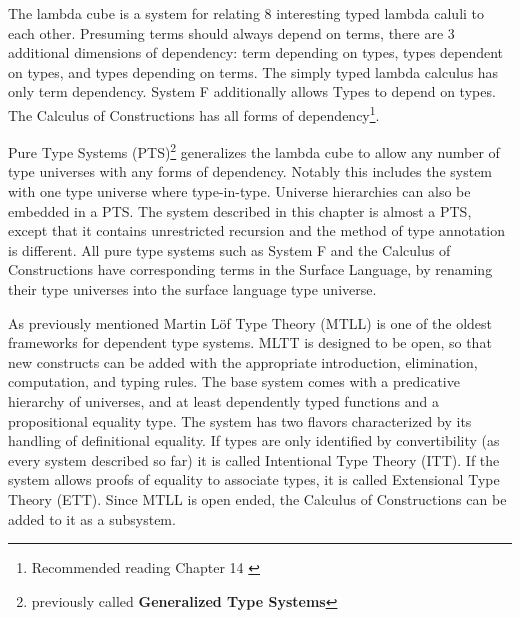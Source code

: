 The lambda cube is a system for relating 8 interesting typed lambda caluli to each other.
Presuming terms should always depend on terms, there are 3 additional dimensions of dependency: term depending on types, types dependent on types, and types depending on terms.
The simply typed lambda calculus has only term dependency.
System F additionally allows Types to depend on types.
The Calculus of Constructions has all forms of dependency\footnote{Recommended reading Chapter 14 \cite{sorensen2006lectures}}.


Pure Type Systems (PTS)\footnote{previously called \textbf{Generalized Type Systems}} generalizes the lambda cube to allow any number of type universes with any forms of dependency.
Notably this includes the system with one type universe where type-in-type.
Universe hierarchies can also be embedded in a PTS.
The system described in this chapter is almost a PTS, except that it contains unrestricted recursion and the method of type annotation is different.
All pure type systems such as System F and the Calculus of Constructions have corresponding terms in the Surface Language, by renaming their type universes into the surface language type universe.



As previously mentioned Martin L{\"o}f Type Theory (MTLL) \cite{Martin-Lof-1972} is one of the oldest frameworks for dependent type systems.
MLTT is designed to be open, so that new constructs can be added with the appropriate introduction, elimination, computation, and typing rules.
The base system comes with a predicative hierarchy of universes, and at least dependently typed functions and a propositional equality type.
The system has two flavors characterized by its handling of definitional equality.
If types are only identified by convertibility (as every system described so far) it is called Intentional Type Theory (ITT).
If the system allows proofs of equality to associate types, it is called Extensional Type Theory (ETT).
Since MTLL is open ended, the Calculus of Constructions can be added to it as a subsystem\cite{aspinall2004dependent,hofmann1997extensional}.



